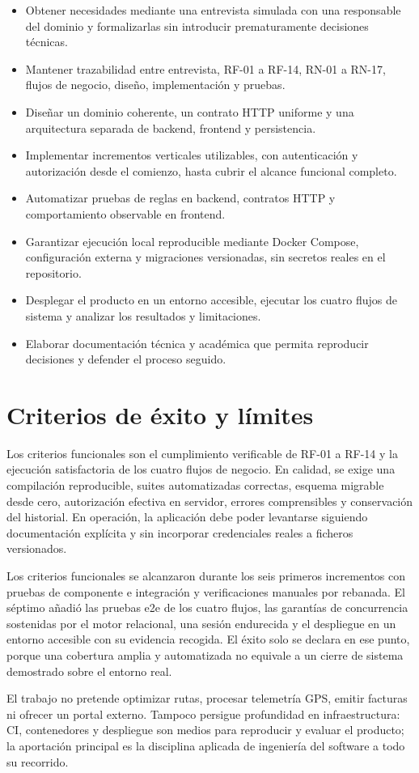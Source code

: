 \begin{itemize}
  \item Obtener necesidades mediante una entrevista simulada con una responsable del dominio y formalizarlas sin introducir prematuramente decisiones técnicas.
  \item Mantener trazabilidad entre entrevista, RF-01 a RF-14, RN-01 a RN-17, flujos de negocio, diseño, implementación y pruebas.
  \item Diseñar un dominio coherente, un contrato HTTP uniforme y una arquitectura separada de backend, frontend y persistencia.
  \item Implementar incrementos verticales utilizables, con autenticación y autorización desde el comienzo, hasta cubrir el alcance funcional completo.
  \item Automatizar pruebas de reglas en backend, contratos HTTP y comportamiento observable en frontend.
  \item Garantizar ejecución local reproducible mediante Docker Compose, configuración externa y migraciones versionadas, sin secretos reales en el repositorio.
  \item Desplegar el producto en un entorno accesible, ejecutar los cuatro flujos de sistema y analizar los resultados y limitaciones.
  \item Elaborar documentación técnica y académica que permita reproducir decisiones y defender el proceso seguido.
\end{itemize}

\section{Criterios de éxito y límites}

Los criterios funcionales son el cumplimiento verificable de RF-01 a RF-14 y la ejecución satisfactoria de los cuatro flujos de negocio. En calidad, se exige una compilación reproducible, suites automatizadas correctas, esquema migrable desde cero, autorización efectiva en servidor, errores comprensibles y conservación del historial. En operación, la aplicación debe poder levantarse siguiendo documentación explícita y sin incorporar credenciales reales a ficheros versionados.

Los criterios funcionales se alcanzaron durante los seis primeros incrementos con pruebas de componente e integración y verificaciones manuales por rebanada. El séptimo añadió las pruebas \gls{e2e} de los cuatro flujos, las garantías de concurrencia sostenidas por el motor relacional, una sesión endurecida y el despliegue en un entorno accesible con su evidencia recogida. El éxito solo se declara en ese punto, porque una cobertura amplia y automatizada no equivale a un cierre de sistema demostrado sobre el entorno real.

El trabajo no pretende optimizar rutas, procesar telemetría GPS, emitir facturas ni ofrecer un portal externo. Tampoco persigue profundidad en infraestructura: CI, contenedores y despliegue son medios para reproducir y evaluar el producto; la aportación principal es la disciplina aplicada de ingeniería del software a todo su recorrido.
